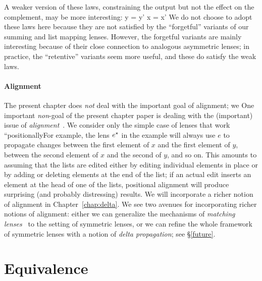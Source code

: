 \iffull
A weaker version of these laws, constraining the output but not the effect
on the complement, may be more interesting:
%
{
  {y = y'}
  {x = x'}
}
%
  We do not choose to adopt these laws here because they are not satisfied
  by the ``forgetful'' variants of our summing and list mapping lenses.
  However, the forgetful variants are mainly interesting because of
  their close connection to analogous asymmetric lenses; in practice, the
  ``retentive'' variants seem more useful, and these do satisfy the weak
   laws.  
\fi %

\paragraph*{Alignment}\label{firstalign}

\ifdissertation
The present chapter does \emph{not} deal with the important goal of
alignment; we
\else
One important {\em non}-goal of the present chapter paper is dealing with
the (important) issue of {\em alignment}~\cite{Boomerang07,Matching10}. We
\fi
consider only the simple case of lenses
that work ``positionally\dotquote For example, the lens $e^\star$ in the example
will always use $e$ to propagate
changes between the first element of $x$ and the first element of $y$,
between the second element of $x$ and the second of $y$, and so on.  This
amounts to assuming that the lists are edited either by editing individual
elements in place or by adding or deleting elements at the end of the list;
if an actual edit inserts an element at the head of one of the lists,
positional alignment will produce surprising (and probably distressing)
results.
\ifdissertation
We will incorporate a richer notion of alignment in
Chapter~\ref{chap:delta}.
\else
We see two avenues for incorporating richer notions of alignment:
either we can generalize the mechanisms of {\em matching
  lenses}~\cite{Matching10} to the setting of symmetric lenses, or we can
refine the whole framework of symmetric lenses with a notion of {\em delta
propagation}; see \S\ref{future}.
\fi%

\section{Equivalence}\label{equiv}

